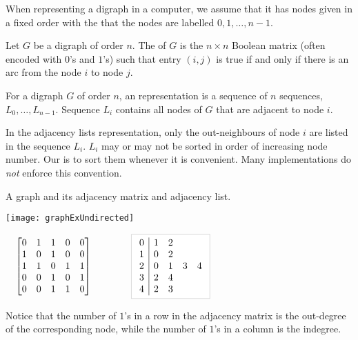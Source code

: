 When representing a digraph in a computer, we assume
that it has nodes given in a fixed order with the
 that the nodes are labelled $0, 1, \dots, n - 1$.

\begin{Definition}
Let $G$ be a digraph of order $n$. The  of $G$
is the $n\times n$ Boolean matrix (often encoded with $0$'s and $1$'s)
such that entry $(i, j)$ is true if and only if there is an arc from the
node $i$ to node $j$.
\end{Definition}

\begin{Definition}
For a digraph $G$ of order $n$, an 
representation is a sequence of $n$ sequences, $L_0, \dots, L_{n-1}$. 
Sequence $L_i$ contains all nodes of $G$ that are adjacent to node $i$.
\end{Definition}

In the adjacency lists representation, only the out-neighbours of node $i$ are listed in the sequence $L_i$. 
$L_i$ may or may not be sorted in order of increasing node number. 
Our  is to sort them whenever it is convenient. 
Many implementations do \emph{not} enforce this convention.

\begin{Boxample}
A graph and its adjacency matrix and adjacency list.\\
\begin{center}
\begin{minipage}[c]{0.3\textwidth}
\centering
\texttt{[image: graphExUndirected]}
\end{minipage}
\begin{minipage}[c]{0.65\textwidth}
$\quad \left[
	\begin{matrix}
	0 & 1 & 1 & 0 & 0 \\
	1 & 0 & 1 & 0 & 0 \\
	1 & 1 & 0 & 1 & 1 \\
	0 & 0 & 1 & 0 & 1 \\
	0 & 0 & 1 & 1 & 0 
	\end{matrix}
\right] 
\qquad \qquad
\lightgraybox{
	\begin{array}{c|cccc}
	0 & 1 & 2 &   &   \\
	1 & 0 & 2 &   &   \\
	2 & 0 & 1 & 3 & 4 \\
	3 & 2 & 4 &   &   \\
	4 & 2 & 3 &   &   \\
	\end{array}
}
$
\end{minipage}
\end{center}
Notice that the number of $1$'s in a row in the adjacency matrix is the out-degree of the corresponding node, 
while the number of $1$'s in a column is the indegree.
\end{Boxample}


